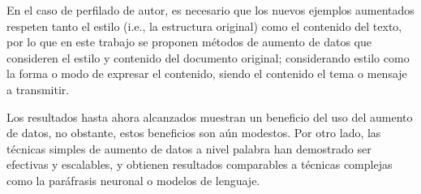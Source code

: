 En el caso de perfilado de autor, es necesario que los nuevos ejemplos aumentados respeten tanto el estilo (i.e., la estructura original) como el contenido del texto, por lo que en este trabajo se proponen métodos de aumento de datos que consideren el estilo y contenido del documento original; considerando estilo como la forma o modo de expresar el contenido, siendo el contenido el tema o mensaje a transmitir.

Los resultados hasta ahora alcanzados muestran un beneficio del uso del aumento de datos, no obstante, estos beneficios son aún modestos. Por otro lado, las técnicas simples de aumento de datos a nivel palabra han demostrado ser efectivas y escalables, y obtienen resultados comparables a técnicas complejas como  la paráfrasis neuronal o modelos de lenguaje.


